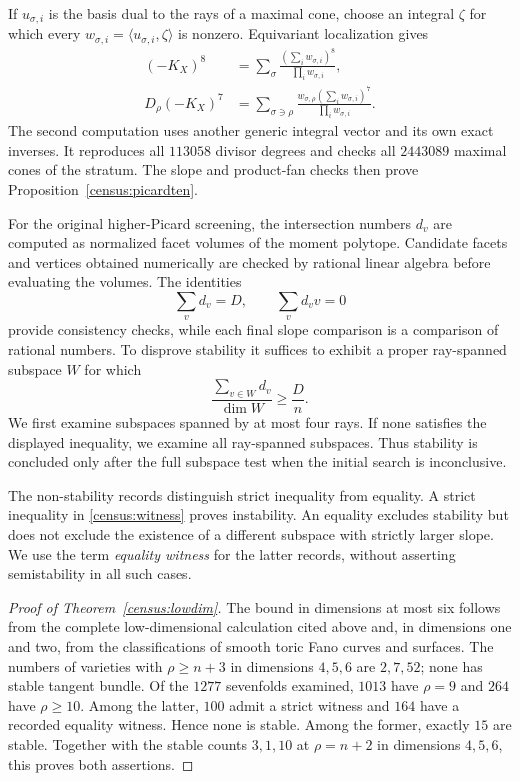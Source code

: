 If $u_{\sigma,i}$ is the basis dual to the rays of a maximal cone,
choose an integral $\zeta$ for which every
$w_{\sigma,i}=\langle u_{\sigma,i},\zeta\rangle$ is nonzero.
Equivariant localization gives
\begin{equation}\label{census:localization}
 \begin{split}
 (-K_X)^8&=\sum_\sigma
 \frac{(\sum_iw_{\sigma,i})^8}{\prod_iw_{\sigma,i}},\\
 D_\rho(-K_X)^7&=\sum_{\sigma\ni\rho}
 \frac{w_{\sigma,\rho}(\sum_iw_{\sigma,i})^7}
      {\prod_iw_{\sigma,i}}.
 \end{split}
\end{equation}
The second computation uses another generic integral vector and its
own exact inverses. It reproduces all $113058$ divisor degrees and
checks all $2443089$ maximal cones of the stratum. The slope and
product-fan checks then prove Proposition~\ref{census:picardten}.

For the original higher-Picard screening, the intersection numbers $d_v$ are
computed as normalized facet volumes of the moment polytope.
Candidate facets and vertices obtained numerically are checked by
rational linear algebra before evaluating the volumes.  The identities
\[
 \sum_vd_v=D,\qquad \sum_vd_vv=0
\]
provide consistency checks, while each final slope comparison is a
comparison of rational numbers.  To disprove stability it suffices to
exhibit a proper ray-spanned subspace $W$ for which
\begin{equation}\label{census:witness}
 \frac{\sum_{v\in W}d_v}{\dim W}\ge\frac Dn.
\end{equation}
We first examine subspaces spanned by at most four rays.
If none satisfies the displayed inequality, we examine all ray-spanned
subspaces. Thus stability is concluded only after the full subspace
test when the initial search is inconclusive.

The non-stability records distinguish strict inequality from equality.
A strict inequality in \eqref{census:witness} proves instability.  An equality
excludes stability but does not exclude the existence of a different
subspace with strictly larger slope.  We use the term
\emph{equality witness} for the latter records, without asserting
semistability in all such cases.

\begin{proof}[Proof of Theorem~\ref{census:lowdim}]
The bound in dimensions at most six follows from the complete
low-dimensional calculation cited above and, in dimensions one and
two, from the classifications of smooth toric Fano curves and surfaces.
The numbers of varieties with $\rho\ge n+3$ in dimensions $4,5,6$
are $2,7,52$; none has stable tangent bundle.
Of the $1277$ sevenfolds examined, $1013$ have $\rho=9$ and $264$
have $\rho\ge10$.  Among the latter, $100$ admit a strict witness
and $164$ have a recorded equality witness.  Hence none is stable.
Among the former, exactly $15$ are stable.  Together with the stable
counts $3,1,10$ at $\rho=n+2$ in dimensions $4,5,6$, this proves both
assertions.
\end{proof}

